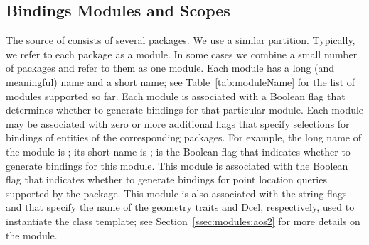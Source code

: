 \subsection{Bindings Modules and Scopes}
\label{sec:gen:scopes}
The source of \cgal{} consists of several packages.  We use a similar
partition. Typically, we refer to each package as a module. In some
cases we combine a small number of packages and refer to them as one
module. Each module has a long (and meaningful) name and a short name;
see Table~\ref{tab:moduleName} for the list of modules supported so
far. Each module is associated with a \cmake{} Boolean flag that
determines whether to generate bindings for that particular
module. Each module may be associated with zero or more additional
flags that specify selections for bindings of entities of the
corresponding \cgal{} packages.  For example, the long name of the
\iiDArrangementsPackage{} module is
; its short name is
;
 is the
Boolean flag that indicates whether to generate bindings for this
module.  This module is associated with the Boolean flag
 that indicates
whether to generate bindings for point location queries supported by
the \iiDArrangementsPackage{} package. This module is also associated
with the string flags
 and
 that specify the name of the
geometry traits and Dcel, respectively, used to instantiate the
 class template;
see Section~\ref{ssec:modules:aos2} for more details on the
\iiDArrangementsPackage{} module.

